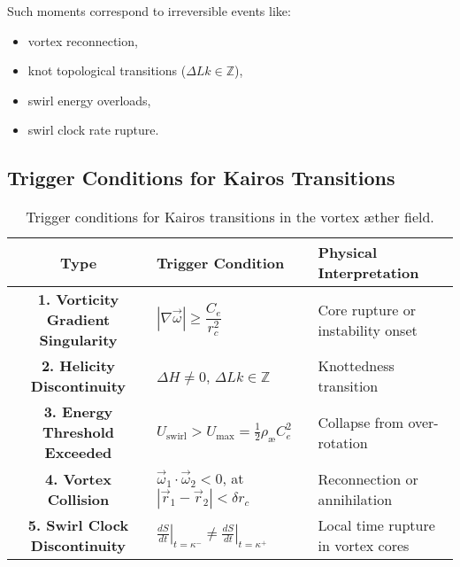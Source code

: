 \documentclass[12pt]{article}
\begin{document}
    Such moments correspond to irreversible events like:
    \begin{itemize}
        \item vortex reconnection,
        \item knot topological transitions (\( \Delta Lk \in \mathbb{Z} \)),
        \item swirl energy overloads,
        \item swirl clock rate rupture.
    \end{itemize}

    \subsection*{Trigger Conditions for Kairos Transitions}

    \begin{table}[H]
        \centering
        \footnotesize
        \renewcommand{\arraystretch}{1.3}
        \begin{tabular}{|c|p{5cm}|p{6cm}|}
            \hline
            \textbf{Type} & \textbf{Trigger Condition} & \textbf{Physical Interpretation} \\
            \hline
            \textbf{1. Vorticity Gradient Singularity} &
            $|\nabla \vec{\omega}| \geq \dfrac{C_e}{r_c^2}$ &
            Core rupture or instability onset \\
            \textbf{2. Helicity Discontinuity} &
            $\Delta H \neq 0$, $\Delta Lk \in \mathbb{Z}$ &
            Knottedness transition \\
            \textbf{3. Energy Threshold Exceeded} &
            $U_{\text{swirl}} > U_{\text{max}} = \frac{1}{2} \rho_{\text{\ae}} C_e^2$ &
            Collapse from over-rotation \\
            \textbf{4. Vortex Collision} &
            $\vec{\omega}_1 \cdot \vec{\omega}_2 < 0$, at $|\vec{r}_1 - \vec{r}_2| < \delta r_c$ &
            Reconnection or annihilation \\
            \textbf{5. Swirl Clock Discontinuity} &
            $\left.\frac{dS}{dt}\right|_{t = \kappa^-} \neq \left.\frac{dS}{dt}\right|_{t = \kappa^+}$ &
            Local time rupture in vortex cores \\
            \hline
        \end{tabular}
        \caption{Trigger conditions for Kairos transitions in the vortex æther field.}\label{tab:table}
    \end{table}
\end{document}
